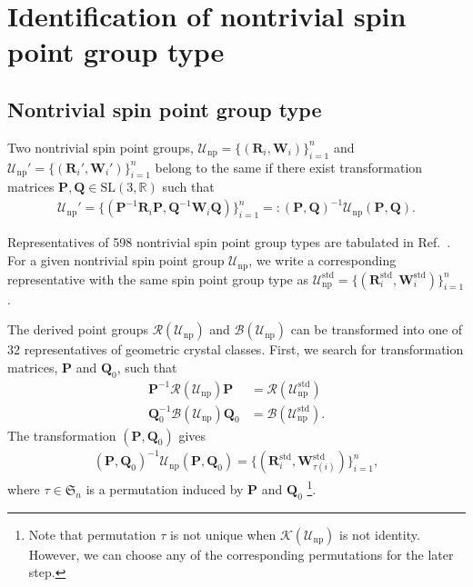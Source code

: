 \section{Identification of nontrivial spin point group type}

\subsection{Nontrivial spin point group type}

Two nontrivial spin point groups, $\mathcal{U}_{\mathrm{np}} = \{ (\bm{R}_{i}, \bm{W}_{i}) \}_{i=1}^{n}$ and $\mathcal{U}_{\mathrm{np}}'= \{ (\bm{R}_{i}', \bm{W}_{i}') \}_{i=1}^{n}$ belong to the same  if there exist transformation matrices $\bm{P}, \bm{Q} \in \mathrm{SL}(3, \mathbb{R})$ such that
\begin{align}
  \mathcal{U}_{\mathrm{np}}'
    = \{ (\bm{P}^{-1} \bm{R}_{i} \bm{P}, \bm{Q}^{-1} \bm{W}_{i} \bm{Q}) \}_{i=1}^{n}
    =: (\bm{P}, \bm{Q})^{-1} \mathcal{U}_{\mathrm{np}} (\bm{P}, \bm{Q}).
\end{align}

Representatives of 598 nontrivial spin point group types are tabulated in Ref.~\cite{Litvin:a14103}.
For a given nontrivial spin point group $\mathcal{U}_{\mathrm{np}}$, we write a corresponding representative with the same spin point group type as $\mathcal{U}_{\mathrm{np}}^{\mathrm{std}} = \{ (\bm{R}_{i}^{\mathrm{std}}, \bm{W}_{i}^{\mathrm{std}}) \}_{i=1}^{n}$.

The derived point groups $\mathcal{R}(\mathcal{U}_{\mathrm{np}})$ and $\mathcal{B}(\mathcal{U}_{\mathrm{np}})$ can be transformed into one of 32 representatives of geometric crystal classes.
First, we search for transformation matrices, $\bm{P}$ and $\bm{Q}_{0}$, such that
\begin{align}
  \bm{P}^{-1} \mathcal{R}(\mathcal{U}_{\mathrm{np}}) \bm{P} &= \mathcal{R}(\mathcal{U}_{\mathrm{np}}^{\mathrm{std}}) \\
  \bm{Q}_{0}^{-1} \mathcal{B}(\mathcal{U}_{\mathrm{np}}) \bm{Q}_{0} &= \mathcal{B}(\mathcal{U}_{\mathrm{np}}^{\mathrm{std}}).
\end{align}
The transformation $(\bm{P}, \bm{Q}_{0})$ gives
\begin{align}
  \label{eq:initial_transformed_np}
  (\bm{P}, \bm{Q}_{0})^{-1} \mathcal{U}_{\mathrm{np}} (\bm{P}, \bm{Q}_{0})
    = \{ (\bm{R}_{i}^{\mathrm{std}}, \bm{W}_{\tau(i)}^{\mathrm{std}}) \}_{i=1}^{n},
\end{align}
where $\tau \in \mathfrak{S}_{n}$ is a permutation induced by $\bm{P}$ and $\bm{Q}_{0}$ \footnote{
  Note that permutation $\tau$ is not unique when $\mathcal{K}(\mathcal{U}_{\mathrm{np}})$ is not identity.
  However, we can choose any of the corresponding permutations for the later step.
}.

